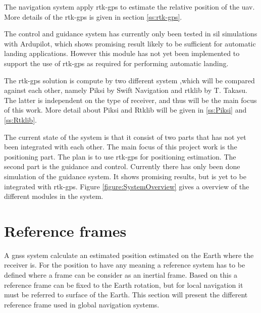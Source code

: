 The navigation system apply \gls{rtk-gps} to estimate the relative position of the \gls{uav}. More details of the \gls{rtk-gps} is given in section \ref{ss:rtk-gps}.

The control and guidance system has currently only been tested in \gls{sil} simulations with Ardupilot, which shows promising result likely to be sufficient for automatic landing applications. However this module has not yet been implemented to support the use of \gls{rtk-gps} as required for performing automatic landing.

The \gls{rtk-gps} solution is compute by two different system ,which will be compared against each other, namely Piksi by Swift Navigation and \gls{rtklib} by T. Takasu. The latter is independent on the type of receiver, and thus will be the main focus of this work. More detail about Piksi and Rtklib will be given in \ref{ss:Piksi} and \ref{ss:Rtklib}.



The current state of the system is that it consist of two parts that has not yet been integrated with each other. The main focus of this project work is the positioning part. The plan is to use \gls{rtk-gps} for positioning estimation. The second part is the guidance and control. Currently there has only been done simulation of the guidance system. It shows promising results, but is yet to be integrated with \gls{rtk-gps}. Figure \ref{figure:SystemOverview} gives a overview of the different modules in the system.
\section{Reference frames}
A \gls{gnss} system calculate an estimated position estimated on the Earth where the receiver is. For the position to have any meaning a reference system has to be defined where a frame can be consider as an inertial frame. Based on this a reference frame can be fixed to the Earth rotation, but for local navigation it must be referred to surface of the Earth. This section will present the different reference frame used in global navigation systems.

